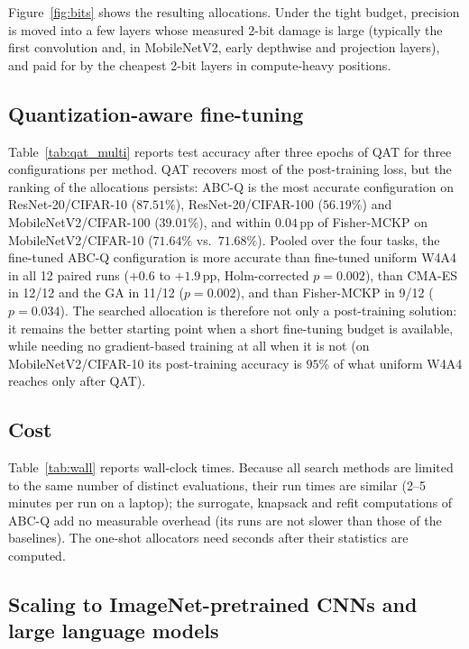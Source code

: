 \documentclass[11pt,a4paper]{article}
\begin{document}
Figure~\ref{fig:bits} shows the resulting allocations. Under the tight budget, precision is moved
into a few layers whose measured 2-bit damage is large (typically the first convolution and, in
MobileNetV2, early depthwise and projection layers), and paid for by the cheapest 2-bit layers in
compute-heavy positions.

\subsection{Quantization-aware fine-tuning}



Table~\ref{tab:qat_multi} reports test accuracy after three epochs of QAT for three configurations per
method. QAT recovers most of the post-training loss, but the ranking of the allocations persists:
ABC-Q is the most accurate configuration on ResNet-20/CIFAR-10 ($87.51\%$), ResNet-20/CIFAR-100
($56.19\%$) and MobileNetV2/CIFAR-100 ($39.01\%$), and within $0.04$\,pp of Fisher-MCKP on
MobileNetV2/CIFAR-10 ($71.64\%$ vs.\ $71.68\%$). Pooled over the four tasks, the fine-tuned ABC-Q
configuration is more accurate than fine-tuned uniform W4A4 in all 12 paired runs ($+0.6$ to $+1.9$\,pp,
Holm-corrected $p=0.002$), than CMA-ES in 12/12 and the GA in 11/12 ($p=0.002$), and than Fisher-MCKP in
9/12 ($p=0.034$). The searched allocation is therefore not only a post-training solution: it remains the
better starting point when a short fine-tuning budget is available, while needing no gradient-based
training at all when it is not (on MobileNetV2/CIFAR-10 its post-training accuracy is $95\%$ of what
uniform W4A4 reaches only after QAT).

\subsection{Cost}



Table~\ref{tab:wall} reports wall-clock times. Because all search methods are limited to the same
number of distinct evaluations, their run times are similar (2--5 minutes per run on a laptop); the
surrogate, knapsack and refit computations of ABC-Q add no measurable overhead (its runs are not
slower than those of the baselines). The one-shot allocators need seconds after their statistics are computed.

\subsection{Scaling to ImageNet-pretrained CNNs and large language models}
\label{sec:scaling}
\end{document}
